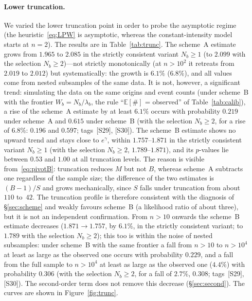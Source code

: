 \documentclass[11pt,a4paper]{article}
\theoremstyle{plain}
\theoremstyle{remark}
\newcommand{\eg}{e^{\gamma}}
\begin{document}
\paragraph{Lower truncation.} We varied the lower truncation point in order to
probe the asymptotic regime (the heuristic~\eqref{eq:LPW} is asymptotic, whereas
the constant-intensity model starts at $n=2$). The results are in
Table~\ref{tab:trunc}. The scheme~A estimate grows from $1.965$ to $2.085$ in the
strictly consistent variant $N_b\ge1$ (to $2.099$ with the selection
$N_b\ge2$)---not strictly monotonically (at $n>10^{2}$ it retreats from $2.019$ to
$2.012$) but systematically: the growth is $6.1\%$ ($6.8\%$), and all values come
from nested subsamples of the same data. It is not, however, a significant trend:
simulating the data on the same origins and event counts (under scheme~B with the
frontier $W_b=N_b/\lambda_b$, the rule ``$\mathbb E[\#]$ = observed'' of
Table~\ref{tab:calib}), a rise of the scheme~A estimate by at least $6.1\%$ occurs
with probability $0.219$ under scheme~A and $0.615$ under scheme~B (with the
selection $N_b\ge2$, for a rise of $6.8\%$: $0.196$ and $0.597$; tags~[S29],
[S30]). The scheme~B estimate
shows no upward trend and stays close to $\eg$, within $1.757$--$1.871$ in the
strictly consistent variant $N_b\ge1$ (with the selection $N_b\ge2$,
$1.789$--$1.871$), and its
$p$-values lie between $0.53$ and $1.00$ at all truncation levels. The reason is
visible from~\eqref{eq:pivotB}: truncation reduces $M$ but not $B$, whereas
scheme~A subtracts one regardless of the sample size; the difference of the two
estimates is $(B-1)/S$ and grows mechanically, since $S$ falls under truncation
from about $110$ to~$42$. The truncation profile is therefore consistent with
the diagnosis of \S\ref{sec:scheme} and weakly favours scheme~B (a likelihood
ratio of about three), but it is not an independent confirmation. From $n>10$
onwards the scheme~B estimate decreases ($1.871\to1.757$, by $6.1\%$, in the
strictly consistent variant; to $1.789$ with the selection $N_b\ge2$); this too is
within the noise of nested subsamples: under scheme~B with the same frontier a fall
from $n>10$ to $n>10^4$ at least as large as the observed one occurs with
probability $0.229$, and a fall from the full sample to $n>10^4$ at least as large
as the observed one ($4.4\%$) with probability $0.306$ (with the selection
$N_b\ge2$, for a fall of $2.7\%$, $0.308$; tags~[S29], [S30]).
The second-order term does not remove this decrease (\S\ref{sec:second}). The
curves are shown in Figure~\ref{fig:trunc}.
\end{document}
